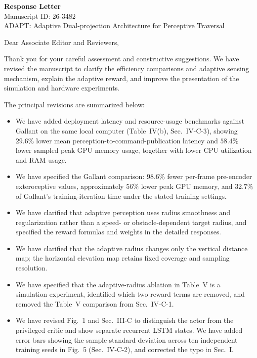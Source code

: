 \documentclass[11pt]{article}
\begin{document}
\begin{center}
{\LARGE\bfseries Response Letter}\\[0.8em]
{\large Manuscript ID: 26-3482}\\[0.35em]
{\large ADAPT: Adaptive Dual-projection Architecture for Perceptive Traversal}
\end{center}
\vspace{0.8em}
Dear Associate Editor and Reviewers,

Thank you for your careful assessment and constructive suggestions. We have revised the manuscript to clarify the efficiency comparisons and adaptive sensing mechanism, explain the adaptive reward, and improve the presentation of the simulation and hardware experiments.

The principal revisions are summarized below:
\begin{itemize}
    \item We have added deployment latency and resource-usage benchmarks against Gallant on the same local computer (Table~IV(b), Sec.~IV-C-3), showing $29.6\%$ lower mean perception-to-command-publication latency and $58.4\%$ lower sampled peak GPU memory usage, together with lower CPU utilization and RAM usage.
    \item We have specified the Gallant comparison: $98.6\%$ fewer per-frame pre-encoder exteroceptive values, approximately $56\%$ lower peak GPU memory, and $32.7\%$ of Gallant's training-iteration time under the stated training settings.
    \item We have clarified that adaptive perception uses radius smoothness and regularization rather than a speed- or obstacle-dependent target radius, and specified the reward formulas and weights in the detailed responses.
    \item We have clarified that the adaptive radius changes only the vertical distance map; the horizontal elevation map retains fixed coverage and sampling resolution.
    \item We have specified that the adaptive-radius ablation in Table~V is a simulation experiment, identified which two reward terms are removed, and removed the Table~V comparison from Sec.~IV-C-1.
    \item We have revised Fig.~1 and Sec.~III-C to distinguish the actor from the privileged critic and show separate recurrent LSTM states. We have added error bars showing the sample standard deviation across ten independent training seeds in Fig.~5 (Sec.~IV-C-2), and corrected the typo in Sec.~I.
\end{itemize}
\end{document}
